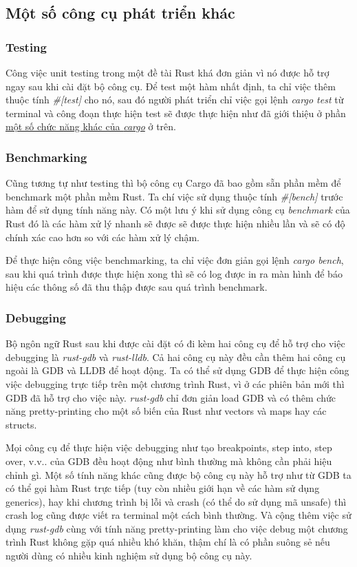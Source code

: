\subsection{Một số công cụ phát triển khác}
\subsubsection{Testing}
Công việc unit testing trong một đề tài Rust khá đơn giản vì nó được hỗ trợ ngay sau khi cài đặt bộ công cụ.
Để test một hàm nhất định, ta chỉ việc thêm thuộc tính \emph{\#[test]} cho nó, sau đó người phát triển chỉ việc gọi lệnh \emph{cargo test} từ terminal và công đoạn thực hiện test sẽ được thực hiện như đã giới thiệu ở phần \hyperref[lbl:cargo_other_features]{một số chức năng khác của \emph{cargo}} ở trên.
\subsubsection{Benchmarking}
Cũng tương tự như testing thì bộ công cụ Cargo đã bao gồm sẵn phần mềm để benchmark một phần mềm Rust.
Ta chí việc sử dụng thuộc tính \emph{\#[bench]} trước hàm để sử dụng tính năng này.
Có một lưu ý khi sử dụng công cụ \emph{benchmark} của Rust đó là các hàm xử lý nhanh sẽ được sẽ được thực hiện nhiều lần và sẽ có độ chính xác cao hơn so với các hàm xử lý chậm.

Để thực hiện công việc benchmarking, ta chỉ việc đơn giản gọi lệnh \emph{cargo bench}, sau khi quá trình được thực hiện xong thì sẽ có log được in ra màn hình để báo hiệu các thông số đã thu thập được sau quá trình benchmark.
\subsubsection{Debugging}
Bộ ngôn ngữ Rust sau khi được cài đặt có đi kèm hai công cụ để hỗ trợ cho việc debugging là \emph{rust-gdb} và \emph{rust-lldb}.
Cả hai công cụ này đều cần thêm hai công cụ ngoài là GDB và LLDB để hoạt động.
Ta có thể sử dụng GDB để thực hiện công việc debugging trực tiếp trên một chương trình Rust, vì ở các phiên bản mới thì GDB đã hỗ trợ cho việc này.
\emph{rust-gdb} chỉ đơn giản load GDB và có thêm chức năng pretty-printing cho một số biến của Rust như vectors và maps hay các structs.

Mọi công cụ để thực hiện việc debugging như tạo breakpoints, step into, step over, v.v.. của GDB đều hoạt động như bình thường mà không cần phải hiệu chỉnh gì.
Một số tính năng khác cũng được bộ công cụ này hỗ trợ như từ GDB ta có thể gọi hàm Rust trực tiếp (tuy còn nhiều giới hạn về các hàm sử dụng generics), hay khi chương trình bị lỗi và crash (có thể do sử dụng mã unsafe) thì crash log cũng được viết ra terminal một cách bình thường.
Và cộng thêm việc sử dụng \emph{rust-gdb} cùng với tính năng pretty-printing làm cho việc debug một chương trình Rust không gặp quá nhiều khó khăn, thậm chí là có phần suông sẻ nếu người dùng có nhiều kinh nghiệm sử dụng bộ công cụ này.

